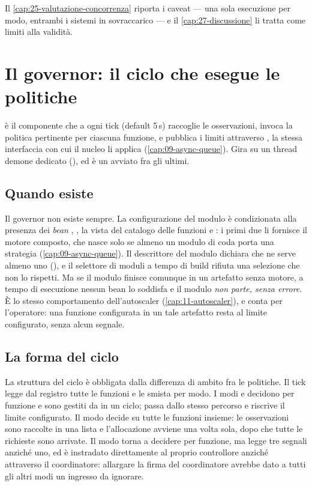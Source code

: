 Il \cref{cap:25-valutazione-concorrenza} riporta i caveat --- una sola esecuzione
per modo, entrambi i sistemi in sovraccarico --- e il
\cref{cap:27-discussione} li tratta come limiti alla validit\`a.

\section{Il governor: il ciclo che esegue le politiche}

 \`e il componente che a ogni tick (default 5\,s)
raccoglie le osservazioni, invoca la politica pertinente per ciascuna funzione, e
pubblica i limiti attraverso , la stessa
interfaccia con cui il nucleo li applica (\cref{cap:09-async-queue}). Gira su un
thread demone dedicato (), ed \`e un
 avviato fra gli ultimi.

\subsection{Quando esiste}

Il governor non esiste sempre. La configurazione del modulo \`e condizionata alla
presenza dei \emph{bean} ,
, la vista del catalogo delle funzioni e
: i primi due li fornisce il motore composto,
che nasce solo se almeno un modulo di coda porta una strategia
(\cref{cap:09-async-queue}). Il descrittore del modulo dichiara che ne serve
almeno uno (), e il selettore di
moduli a tempo di build rifiuta una selezione che non lo rispetti. Ma se il
modulo finisce comunque in un artefatto senza motore, a tempo di esecuzione
nessun bean lo soddisfa e il modulo \emph{non parte, senza errore}. \`E lo stesso
comportamento dell'autoscaler (\cref{cap:11-autoscaler}), e conta per l'operatore:
una funzione configurata  in un tale artefatto resta al limite
configurato, senza alcun segnale.

\subsection{La forma del ciclo}

La struttura del ciclo \`e obbligata dalla differenza di ambito fra le politiche.
Il tick legge dal registro tutte le funzioni e le smista per modo. I modi
 e  decidono per funzione e sono
gestiti da  in un ciclo;  passa
dallo stesso percorso e riscrive il limite configurato. Il modo 
decide su tutte le funzioni insieme: le osservazioni sono raccolte in una lista
e l'allocazione avviene una volta sola, dopo che tutte le richieste sono
arrivate. Il modo  torna a decidere per funzione, ma legge tre
segnali anzich\'e uno, ed \`e instradato direttamente al proprio controllore
anzich\'e attraverso il coordinatore: allargare la firma del coordinatore avrebbe
dato a tutti gli altri modi un ingresso da ignorare.

